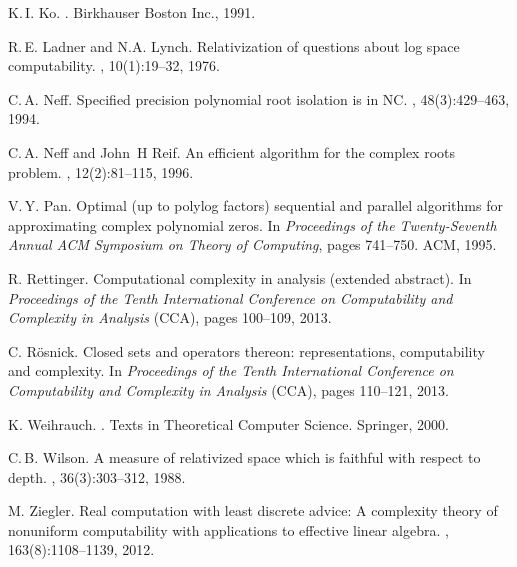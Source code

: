 \documentclass[conference]{IEEEtran}
\theoremstyle{definition}
\theoremstyle{remark}
\begin{document}
\begin{thebibliography}{10}
K.\,I. Ko.
.
\newblock Birkhauser Boston Inc., 1991.

R.\,E. Ladner and N.A. Lynch.
\newblock Relativization of questions about log space computability.
, 10(1):19--32, 1976.

C.\,A. Neff.
\newblock Specified precision polynomial root isolation is in $\mathrm{NC}$.
, 48(3):429--463, 1994.

C.\,A. Neff and John~H Reif.
\newblock An efficient algorithm for the complex roots problem.
, 12(2):81--115, 1996.

V.\,Y. Pan.
\newblock Optimal (up to polylog factors) sequential and parallel algorithms
  for approximating complex polynomial zeros.
\newblock In {\em Proceedings of the Twenty-Seventh Annual ACM Symposium on
  Theory of Computing}, pages 741--750. ACM, 1995.

R. Rettinger. 
\newblock Computational complexity in analysis (extended abstract). 
\newblock In \emph{Proceedings of the Tenth International Conference on Computability and Complexity in Analysis} (CCA), pages 100--109, 2013.

C. R\"osnick. 
\newblock Closed sets and operators thereon: representations, computability and complexity. 
\newblock In \emph{Proceedings of the Tenth International Conference on Computability and Complexity in Analysis} (CCA), pages 110--121, 2013.

K. Weihrauch.
.
\newblock Texts in Theoretical Computer Science. Springer, 2000.

C.\,B. Wilson.
\newblock A measure of relativized space which is faithful with respect to
  depth.
, 36(3):303--312, 1988.

M. Ziegler. 
\newblock Real computation with least discrete advice: A complexity theory of nonuniform computability with applications to effective linear algebra.
, 163(8):1108--1139, 2012. 


\end{thebibliography}
\end{document}

